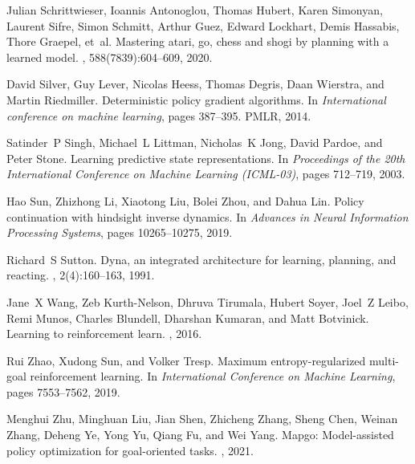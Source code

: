 \documentclass{article}
\begin{document}
\begin{thebibliography}{10}
Julian Schrittwieser, Ioannis Antonoglou, Thomas Hubert, Karen Simonyan,
  Laurent Sifre, Simon Schmitt, Arthur Guez, Edward Lockhart, Demis Hassabis,
  Thore Graepel, et~al.
\newblock Mastering atari, go, chess and shogi by planning with a learned
  model.
, 588(7839):604--609, 2020.

David Silver, Guy Lever, Nicolas Heess, Thomas Degris, Daan Wierstra, and
  Martin Riedmiller.
\newblock Deterministic policy gradient algorithms.
\newblock In {\em International conference on machine learning}, pages
  387--395. PMLR, 2014.

Satinder~P Singh, Michael~L Littman, Nicholas~K Jong, David Pardoe, and Peter
  Stone.
\newblock Learning predictive state representations.
\newblock In {\em Proceedings of the 20th International Conference on Machine
  Learning (ICML-03)}, pages 712--719, 2003.

Hao Sun, Zhizhong Li, Xiaotong Liu, Bolei Zhou, and Dahua Lin.
\newblock Policy continuation with hindsight inverse dynamics.
\newblock In {\em Advances in Neural Information Processing Systems}, pages
  10265--10275, 2019.

Richard~S Sutton.
\newblock Dyna, an integrated architecture for learning, planning, and
  reacting.
, 2(4):160--163, 1991.

Jane~X Wang, Zeb Kurth-Nelson, Dhruva Tirumala, Hubert Soyer, Joel~Z Leibo,
  Remi Munos, Charles Blundell, Dharshan Kumaran, and Matt Botvinick.
\newblock Learning to reinforcement learn.
, 2016.

Rui Zhao, Xudong Sun, and Volker Tresp.
\newblock Maximum entropy-regularized multi-goal reinforcement learning.
\newblock In {\em International Conference on Machine Learning}, pages
  7553--7562, 2019.

Menghui Zhu, Minghuan Liu, Jian Shen, Zhicheng Zhang, Sheng Chen, Weinan Zhang,
  Deheng Ye, Yong Yu, Qiang Fu, and Wei Yang.
\newblock Mapgo: Model-assisted policy optimization for goal-oriented tasks.
, 2021.

\end{thebibliography}
\end{document}
